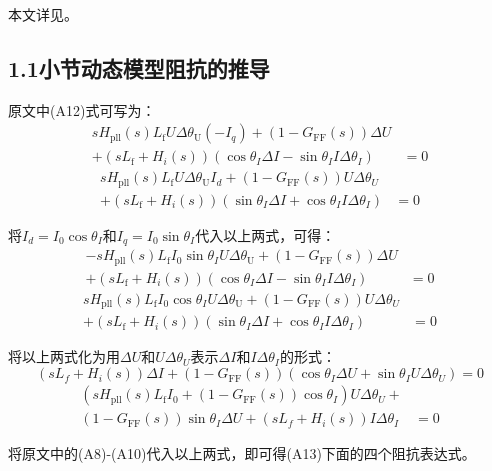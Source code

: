 \documentclass[12pt, a4paper, UTF8, fontset=adobe, scheme=chinese, heading=true, oneside]{ctexbook} %
\begin{document}
本文详见\cite{xin2017}。

\subsection{1.1小节动态模型阻抗的推导}

原文中(A12)式可写为：
\begin{equation}
\begin{split}
  s H_{\mathrm{pll}}(s)L_{\mathrm{f}}U \Delta \theta_{\mathrm{U}}
(-I_q) + (1-G_{\mathrm{FF}}(s))\Delta U & \\ + (sL_{\mathrm{f}}+H_i(s))(\cos\theta_{I}\Delta I - \sin\theta_I I\Delta\theta_I) &= 0 
\end{split}
\end{equation}
\begin{equation}
\begin{split}
  s H_{\mathrm{pll}}(s)L_{\mathrm{f}}U \Delta \theta_{\mathrm{U}}
I_d + (1-G_{\mathrm{FF}}(s))U\Delta \theta_U & \\ + (sL_{\mathrm{f}}+H_i(s))(\sin\theta_{I}\Delta I + \cos\theta_I I\Delta\theta_I) &= 0 
\end{split}
\end{equation}

将$I_d=I_0 \cos\theta_I$和$I_q = I_0 \sin\theta_I$代入以上两式，可得：
\begin{equation}
\begin{split}
  -s H_{\mathrm{pll}}(s)L_{\mathrm{f}}
I_0\sin\theta_I U \Delta \theta_{\mathrm{U}} + (1-G_{\mathrm{FF}}(s))\Delta U & \\ + (sL_{\mathrm{f}}+H_i(s))(\cos\theta_{I}\Delta I - \sin\theta_I I\Delta\theta_I) &= 0 
\end{split}
\end{equation}
\begin{equation}
\begin{split}
  s H_{\mathrm{pll}}(s)L_{\mathrm{f}}I_0\cos\theta_I U \Delta \theta_{\mathrm{U}}
 + (1-G_{\mathrm{FF}}(s))U\Delta \theta_U & \\ + (sL_{\mathrm{f}}+H_i(s))(\sin\theta_{I}\Delta I + \cos\theta_I I\Delta\theta_I) &= 0 \end{split}
\end{equation}

将以上两式化为用$\Delta U$和$U\Delta\theta_U$表示$\Delta I$和$I\Delta\theta_I$的形式：
\begin{equation}
  (sL_f+H_i(s))\Delta I + (1-G_{\mathrm{FF}}(s))(\cos\theta_I\Delta U + \sin\theta_I U\Delta\theta_U) = 0
\end{equation}
\begin{equation}
\begin{split}
  \left(s H_{\mathrm{pll}}(s)L_{\mathrm{f}}I_0 + (1-G_{\mathrm{FF}}(s))\cos\theta_I \right) U \Delta \theta_U + & \\
  (1-G_{\mathrm{FF}}(s))\sin\theta_I\Delta U + (sL_f+H_i(s))I\Delta\theta_I &= 0 
\end{split}
\end{equation}

将原文中的(A8)-(A10)代入以上两式，即可得(A13)下面的四个阻抗表达式。



\end{document}
